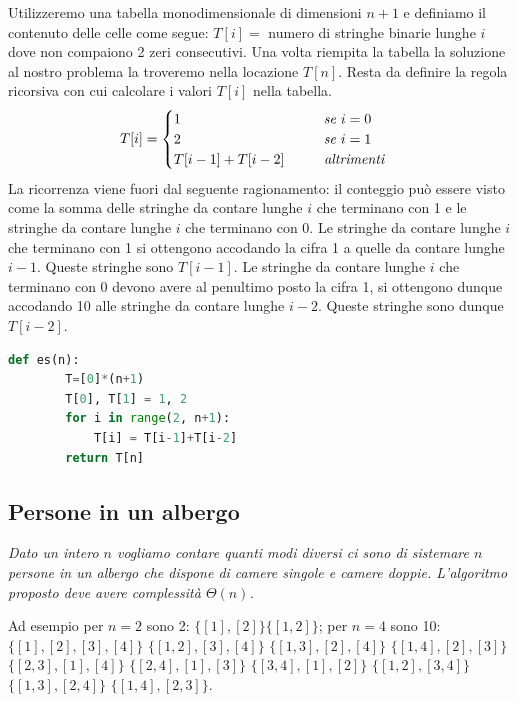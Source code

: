 Utilizzeremo una tabella monodimensionale di dimensioni $n+1$ e definiamo il contenuto delle celle come segue: $T[i] =$ numero di stringhe binarie lunghe $i$ dove non compaiono 2 zeri consecutivi. Una volta riempita la tabella la soluzione al nostro problema la troveremo nella locazione $T[n]$. Resta da definire la regola ricorsiva con cui calcolare i valori $T[i]$ nella tabella.
\begin{equation*}T[i]=
    \begin{cases}
        1\hspace{3.6cm}\textit{se } i=0\\
        2\hspace{3.6cm}\textit{se } i=1\\
        T[i-1]+T[i-2]\hspace{1cm}\textit{altrimenti}\\
    \end{cases}
\end{equation*}
La ricorrenza viene fuori dal seguente ragionamento: il conteggio può essere visto come la somma delle stringhe da contare lunghe $i$ che terminano con 1 e le stringhe da contare lunghe $i$ che terminano con 0. Le stringhe da contare lunghe $i$ che terminano con 1 si ottengono accodando la cifra 1 a quelle da contare lunghe $i-1$. Queste stringhe sono $T[i - 1]$. Le stringhe da contare lunghe $i$ che terminano con 0 devono avere al penultimo posto la cifra 1, si ottengono dunque accodando 10 alle stringhe da contare lunghe $i-2$. Queste stringhe sono dunque $T[i-2]$.
\begin{lstlisting}[language=Python]
    def es(n):
        T=[0]*(n+1)
        T[0], T[1] = 1, 2
        for i in range(2, n+1):
            T[i] = T[i-1]+T[i-2]
        return T[n]
\end{lstlisting}

\subsection{Persone in un albergo}
\textit{Dato un intero $n$ vogliamo contare quanti modi diversi ci sono di sistemare $n$ persone in un albergo che dispone di camere singole e camere doppie. L’algoritmo proposto deve avere complessità $\Theta(n)$.}

Ad esempio per $n=2$ sono 2: $\{[1], [2]\} \{[1,2]\}$; per $n=4$ sono 10: $\{[1], [2], [3], [4]\}$ $\{[1,2], [3], [4]\}$ $\{[1,3], [2], [4]\}$ $\{[1,4], [2], [3]\}$ $\{[2,3], [1], [4]\}$ $\{[2,4], [1], [3]\}$ $\{[3,4], [1], [2]\}$ $\{[1,2], [3,4]\}$ $\{[1,3], [2,4]\}$ $\{[1,4], [2,3]\}$.

